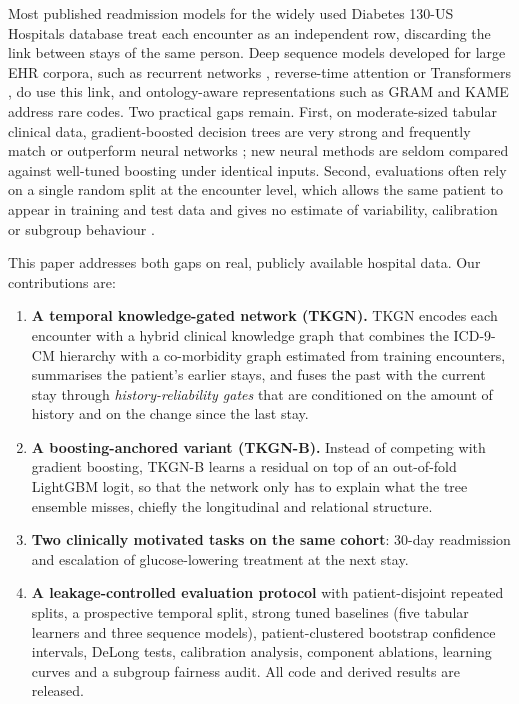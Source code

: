 \documentclass[preprint,12pt,authoryear]{elsarticle}
\begin{document}
Most published readmission models for the widely used Diabetes 130-US
Hospitals database \citep{strack2014} treat each encounter as an
independent row, discarding the link between stays of the same person.
Deep sequence models developed for large EHR corpora, such as recurrent
networks \citep{choi2016doctorai}, reverse-time attention
\citep{choi2016retain} or Transformers \citep{li2020behrt,rasmy2021medbert},
do use this link, and ontology-aware representations such as GRAM
\citep{choi2017gram} and KAME \citep{ma2018kame} address rare codes. Two
practical gaps remain. First, on moderate-sized tabular clinical data,
gradient-boosted decision trees are very strong and frequently match or
outperform neural networks \citep{grinsztajn2022}; new neural methods are
seldom compared against well-tuned boosting under identical inputs.
Second, evaluations often rely on a single random split at the encounter
level, which allows the same patient to appear in training and test data
and gives no estimate of variability, calibration or subgroup behaviour
\citep{collins2015tripod,vancalster2019}.

This paper addresses both gaps on real, publicly available hospital data.
Our contributions are:
\begin{enumerate}
  \item \textbf{A temporal knowledge-gated network (TKGN).} TKGN encodes
  each encounter with a hybrid clinical knowledge graph that combines the
  ICD-9-CM hierarchy with a co-morbidity graph estimated from training
  encounters, summarises the patient's earlier stays, and fuses the past
  with the current stay through \emph{history-reliability gates} that are
  conditioned on the amount of history and on the change since the last
  stay.
  \item \textbf{A boosting-anchored variant (TKGN-B).} Instead of competing
  with gradient boosting, TKGN-B learns a residual on top of an
  out-of-fold LightGBM logit, so that the network only has to explain what
  the tree ensemble misses, chiefly the longitudinal and relational
  structure.
  \item \textbf{Two clinically motivated tasks on the same cohort}:
  30-day readmission and escalation of glucose-lowering treatment at the
  next stay.
  \item \textbf{A leakage-controlled evaluation protocol} with
  patient-disjoint repeated splits, a prospective temporal split, strong
  tuned baselines (five tabular learners and three sequence models),
  patient-clustered bootstrap confidence intervals, DeLong tests,
  calibration analysis, component ablations, learning curves and a
  subgroup fairness audit. All code and derived results are released.
\end{enumerate}
\end{document}
